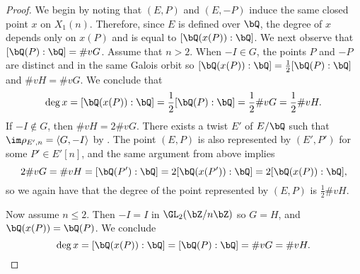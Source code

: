 \documentclass[11pt,reqno]{amsart}
\theoremstyle{plain}
\newtheorem{proposition}[theorem]{Proposition}
\theoremstyle{definition}
\newcommand{\Q}{\bQ}
\newcommand{\Z}{\bZ}
\begin{document}
\begin{proof}
    We begin by noting that $(E, P)$ and $(E, -P)$ induce the same closed point $x$ on $X_1(n)$. Therefore, since $E$ is defined over $\Q$, the degree of
    $x$ depends only on $x(P)$ and is equal to $[\Q(x(P)):\Q]$.
    We next observe that $[\Q(P):\Q]=\#vG$. Assume that $n>2$. When $-I\in G$, the points $P$ and $-P$ are distinct and in the same Galois orbit so $[\Q(x(P)):\Q]=\frac{1}{2}[\Q(P):\Q]$ and $\#vH=\#vG$. We conclude that
    \[
    \deg x = [\Q(x(P)):\Q] = \frac{1}{2}[\Q(P):\Q] = \frac{1}{2}\#vG = \frac{1}{2}\#vH.
    \]
    If $-I \notin G$, then $\#vH=2\#vG$. There exists a twist $E'$ of $E/\Q$ such that $\im \rho_{E',n}=\langle G, -I \rangle$ by \cite[Corollary 5.25]{sutherland}. The point $(E,P)$ is also represented by $(E',P')$ for some $P'\in E'[n]$, and the same argument from above  implies
    \[
    2\#vG=\#vH = [\Q(P'):\Q] = 2[\Q(x(P')):\Q] = 2[\Q(x(P)):\Q],
    \]
    so we again have that the degree of the point represented by $(E,P)$ is $\frac{1}{2}\#vH$.

    Now assume $n\leq 2$. Then $-I=I$ in $\GL_2(\Z/n\Z)$ so $G=H$, and $\Q(x(P))=\Q(P)$. We conclude
    \[
    \deg x = [\Q(x(P)):\Q] = [\Q(P):\Q] = \#vG = \#vH. \qedhere
    \]
\end{proof}


\end{document}
